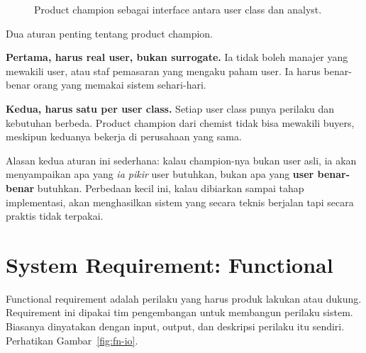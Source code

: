 \documentclass[11pt,a4paper]{article}
\begin{document}
\begin{figure}[H]
	\centering
	\caption{Product champion sebagai interface antara user class dan analyst.}
	\label{fig:champion}
\end{figure}

Dua aturan penting tentang product champion.

\textbf{Pertama, harus real user, bukan surrogate.} Ia tidak boleh manajer yang mewakili user, atau staf pemasaran yang mengaku paham user. Ia harus benar-benar orang yang memakai sistem sehari-hari.

\textbf{Kedua, harus satu per user class.} Setiap user class punya perilaku dan kebutuhan berbeda. Product champion dari chemist tidak bisa mewakili buyers, meskipun keduanya bekerja di perusahaan yang sama.

Alasan kedua aturan ini sederhana: kalau champion-nya bukan user asli, ia akan menyampaikan apa yang \textit{ia pikir} user butuhkan, bukan apa yang \textbf{user benar-benar} butuhkan. Perbedaan kecil ini, kalau dibiarkan sampai tahap implementasi, akan menghasilkan sistem yang secara teknis berjalan tapi secara praktis tidak terpakai.

\section{System Requirement: Functional}

Functional requirement adalah perilaku yang harus produk lakukan atau dukung. Requirement ini dipakai tim pengembangan untuk membangun perilaku sistem. Biasanya dinyatakan dengan input, output, dan deskripsi perilaku itu sendiri. Perhatikan Gambar~\ref{fig:fn-io}.
\end{document}
